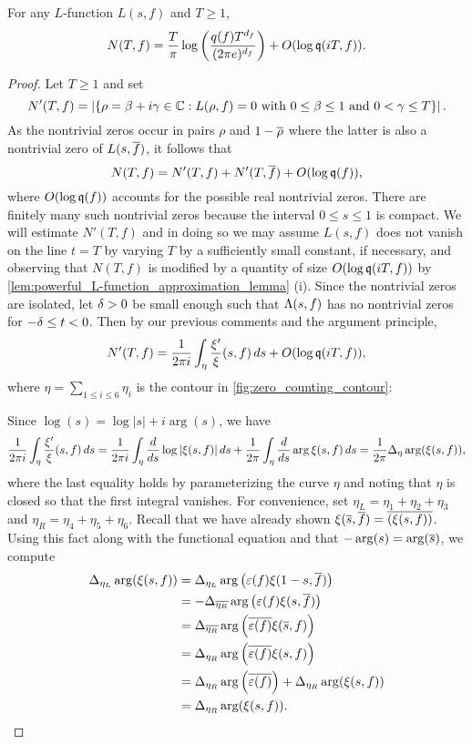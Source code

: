     \begin{theorem}\label{thm:zero_counting}
      For any $L$-function $L(s,f)$ and $T \ge 1$,
      \[
        N(T,f) = \frac{T}{\pi}\log\left(\frac{q(f)T^{d_{f}}}{(2\pi e)^{d_{f}}}\right)+O(\log{\mathfrak{q}(iT,f)}).
      \]
    \end{theorem}
    \begin{proof}
      Let $T \ge 1$ and set
      \[
        N'(T,f) = \left|\{\rho = \beta+i\gamma \in \mathbb{C}:\text{$L(\rho,f) = 0$ with $0 \le \beta \le 1$ and $0 < \gamma \le T$}\}\right|.
      \]
      As the nontrivial zeros occur in pairs $\rho$ and $1-\overline{\rho}$ where the latter is also a nontrivial zero of $L(s,\overline{f})$, it follows that
      \[
        N(T,f) = N'(T,f)+N'(T,\overline{f})+O(\log{\mathfrak{q}(f)}),
      \]
      where $O(\log{\mathfrak{q}(f)})$ accounts for the possible real nontrivial zeros. There are finitely many such nontrivial zeros because the interval $0 \le s \le 1$ is compact. We will estimate $N'(T,f)$ and in doing so we may assume $L(s,f)$ does not vanish on the line $t = T$ by varying $T$ by a sufficiently small constant, if necessary, and observing that $N(T,f)$ is modified by a quantity of size $O(\log{\mathfrak{q}(iT,f)})$ by \cref{lem:powerful_L-function_approximation_lemma} (i). Since the nontrivial zeros are isolated, let $\delta > 0$ be small enough such that $\Lambda(s,f)$ has no nontrivial zeros for $-\delta \le t < 0$. Then by our previous comments and the argument principle,
      \[
        N'(T,f) = \frac{1}{2\pi i}\int_{\eta}\frac{\xi'}{\xi}(s,f)\,ds+O(\log{\mathfrak{q}(iT,f)}),
      \]
      where $\eta = \sum_{1 \le i \le 6}\eta_{i}$ is the contour in \cref{fig:zero_counting_contour}:
      
      Since $\log(s) = \log{|s|}+i\arg(s)$, we have
      \[
        \frac{1}{2\pi i}\int_{\eta}\frac{\xi'}{\xi}(s,f)\,ds = \frac{1}{2\pi i}\int_{\eta}\frac{d}{ds}\log{|\xi(s,f)|}\,ds+\frac{1}{2\pi }\int_{\eta}\frac{d}{ds}\arg\xi(s,f)\,ds = \frac{1}{2\pi}\Delta_{\eta}\arg(\xi(s,f)),
      \]
      where the last equality holds by parameterizing the curve $\eta$ and noting that $\eta$ is closed so that the first integral vanishes. For convenience, set $\eta_{L} = \eta_{1}+\eta_{2}+\eta_{3}$ and $\eta_{R} = \eta_{4}+\eta_{5}+\eta_{6}$. Recall that we have already shown $\xi(\overline{s},\overline{f}) = \overline{(\xi(s,f))}$. Using this fact along with the functional equation and that $-\arg(s) = \arg(\overline{s})$, we compute
      \begin{align*}
        \Delta_{\eta_{L}}\arg(\xi(s,f)) &= \Delta_{\eta_{L}}\arg\left(\varepsilon(f)\xi(1-s,\overline{f})\right) \\
        &= -\Delta_{\overline{\eta_{R}}}\arg\left(\varepsilon(f)\xi(s,\overline{f})\right) \\
        &= \Delta_{\overline{\eta_{R}}}\arg\left(\overline{\varepsilon(f)}\xi(\overline{s},f)\right) \\
        &= \Delta_{\eta_{R}}\arg\left(\overline{\varepsilon(f)}\xi(s,f)\right) \\
        &= \Delta_{\eta_{R}}\arg\left(\overline{\varepsilon(f)}\right)+\Delta_{\eta_{R}}\arg(\xi(s,f)) \\
        &= \Delta_{\eta_{R}}\arg(\xi(s,f)).
      \end{align*}


\end{proof}
